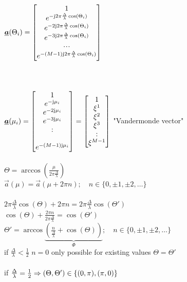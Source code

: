 \begin{doublespace}
$\underline{\boldsymbol {a}}(\Theta_i)=\begin{bmatrix} 1\\e^{-\mathrm{j}2\pi\frac{\Delta}{\lambda}\cos(\Theta_i)}\\e^{-2\mathrm{j}2\pi\frac{\Delta}{\lambda}\cos(\Theta_i)}\\e^{-3\mathrm{j}2\pi\frac{\Delta}{\lambda}\cos(\Theta_i)}\\\!\cdot \!\cdot\!\cdot\!\\e^{-(M-1)\mathrm{j}2\pi\frac{\Delta}{\lambda}\cos(\Theta_i)} \end{bmatrix}  $ \\ \\
\\ \\
$\underline{\boldsymbol {a}}(\mu_i)=\begin{bmatrix} 1\\e^{-\mathrm{j}\mu_i}\\e^{-2\mathrm{j}\mu_i}\\e^{-3\mathrm{j}\mu_i}\\:\\\\e^{-(M-1)\mathrm{j}\mu_i} \end{bmatrix}=\begin{bmatrix} 1\\\xi^1\\\xi^2\\\xi^3\\:\\\xi^{M-1} \end{bmatrix}$ "Vandermonde vector"\\ \\
$\Theta=\arccos\left(\frac{\mu}{2\pi\frac{\Delta}{\lambda}}\right)$\\
$\vec{a}(\mu)=\vec{a}(\mu+2\pi n); \quad n\in\{0,\pm1,\pm2,\ldots\}$\\
\\
$2\pi\frac{\Delta}{\lambda}\cos(\Theta)+2\pi n = 2\pi\frac{\Delta}{\lambda}\cos(\Theta')$\\
$\cos(\Theta)+\frac{2\pi n}{2\pi\frac{\Delta}{\lambda}}=\cos(\Theta')$\\
$\Theta'=\arccos\underbrace{\left(\frac{n}{\frac{\Delta}{\lambda}}+\cos(\Theta)\right)}_{\Phi};\quad n\in\{0,\pm1,\pm2,\ldots\}$\\
if $\frac{\Delta}{\lambda} < \frac{1}{2}$ \Ra $n=0$ only possible for existing values $\Theta=\Theta'$\\ \\
if $\frac{\Delta}{\lambda}=\frac{1}{2} \Rightarrow (\Theta,\Theta')\in\{(0,\pi),(\pi,0)\}$\\

\end{doublespace}
